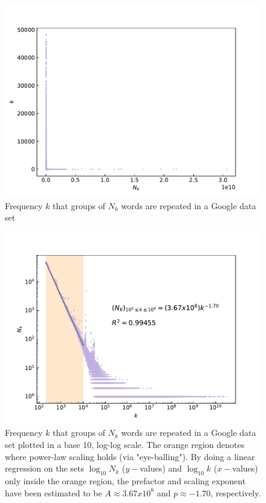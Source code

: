 \documentclass{article}
\begin{document}
\begin{figure}[h!]
\includegraphics[width=\linewidth]{Q06/wordFrequency.pdf}
\caption{Frequency $k$ that groups of $N_k$ words are repeated in a Google data set}
\label{fig:words}
\end{figure}

\begin{figure}[h!]
\includegraphics[width=\linewidth]{Q06/wordFrequencyLog.pdf}
\caption{Frequency $k$ that groups of $N_k$ words are repeated in a Google data set plotted in a base 10, log-log scale. The orange region denotes where power-law scaling holds (via "eye-balling"). By doing a linear regression on the sets $\log_{10} N_k$  ($y-$values) and $\log_{10} k$ ($x-$values) only inside the orange region, the prefactor and scaling exponent have been estimated to be $A \approx 3.67 x 10^{8}$ and $p \approx -1.70$, respectively.}
\label{fig:envelope}
\end{figure}
\end{document}
